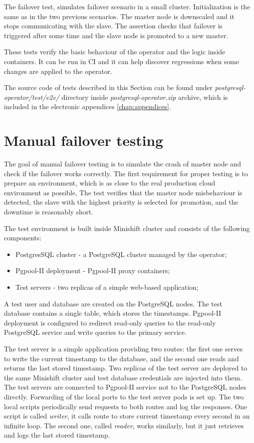 \documentclass[
  digital, %
  twoside, %
  table,   %
  nolof,   %
  nolot,   %
]{fithesis3}
\begin{document}
The failover test, simulates failover scenario in a small cluster. Initialization is the same as in the two previous scenarios. The master node is downscaled and it stops communicating with the slave. The assertion checks that failover is triggered after some time and the slave node is promoted to a new master.

These tests verify the basic behaviour of the operator and the logic inside containers. It can be run in CI and it can help discover regressions when some changes are applied to the operator.

The source code of tests described in this Section can be found under \textit{postgresql-operator/test/e2e/} directory inside \textit{postgresql-operator.zip} archive, which is included in the electronic appendices \ref{chap:appendices}.

\section{Manual failover testing}
The goal of manual failover testing is to simulate the crash of master node and check if the failover works correctly. The first requirement for proper testing is to prepare an environment, which is as close to the real production cloud environment as possible, The test verifies that the master node misbehaviour is detected, the slave with the highest priority is selected for promotion, and the downtime is reasonably short.

The test environment is built inside Minishift cluster and consists of the following components:
\begin{itemize}
  \item PostgresSQL cluster - a PostgreSQL cluster managed by the operator;
  \item Pgpool-II deployment - Pgpool-II proxy containers;
  \item Test servers - two replicas of a simple web-based application;
\end{itemize}

A test user and database are created on the PostgreSQL nodes. The test database contains a single table, which stores the timestamps. Pgpool-II deployment is configured to redirect read-only queries to the read-only PostgreSQL service and write queries to the primary service.

The test server is a simple application providing two routes: the first one serves to write the current timestamp to the database, and the second one reads and returns the last stored timestamp. Two replicas of the test server are deployed to the same Minishift cluster and test database credentials are injected into them. The test servers are connected to Pgpool-II service not to the PostgreSQL nodes directly. Forwarding of the local ports to the test server pods is set up. The two local scripts periodically send requests to both routes and log the responses. One script is called \textit{writer}, it calls route to store current timestamp every second in an infinite loop. The second one, called \textit{reader}, works similarly, but it just retrieves and logs the last stored timestamp.
\end{document}
